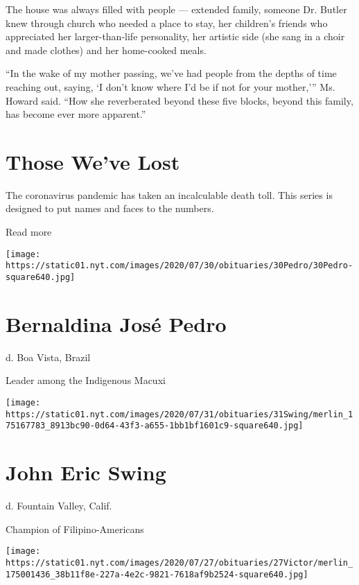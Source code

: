 The house was always filled with people --- extended family, someone Dr.
Butler knew through church who needed a place to stay, her children's
friends who appreciated her larger-than-life personality, her artistic
side (she sang in a choir and made clothes) and her home-cooked meals.

``In the wake of my mother passing, we've had people from the depths of
time reaching out, saying, `I don't know where I'd be if not for your
mother,''' Ms. Howard said. ``How she reverberated beyond these five
blocks, beyond this family, has become ever more apparent.''

\href{https://www.nytimes.com/interactive/2020/obituaries/people-died-coronavirus-obituaries.html?action=click\&pgtype=Article\&state=default\&region=BELOW_MAIN_CONTENT\&context=covid_obits_promo}{}

\hypertarget{those-weve-lost}{%
\section{Those We've Lost}\label{those-weve-lost}}

The coronavirus pandemic has taken an incalculable death toll. This
series is designed to put names and faces to the numbers.

Read more

\texttt{[image: https://static01.nyt.com/images/2020/07/30/obituaries/30Pedro/30Pedro-square640.jpg]}

\hypertarget{bernaldina-josuxe9-pedro}{%
\section{Bernaldina José Pedro}\label{bernaldina-josuxe9-pedro}}

d. Boa Vista, Brazil

Leader among the Indigenous Macuxi

\texttt{[image: https://static01.nyt.com/images/2020/07/31/obituaries/31Swing/merlin\_175167783\_8913bc90-0d64-43f3-a655-1bb1bf1601c9-square640.jpg]}

\hypertarget{john-eric-swing}{%
\section{John Eric Swing}\label{john-eric-swing}}

d. Fountain Valley, Calif.

Champion of Filipino-Americans

\texttt{[image: https://static01.nyt.com/images/2020/07/27/obituaries/27Victor/merlin\_175001436\_38b11f8e-227a-4e2c-9821-7618af9b2524-square640.jpg]}

